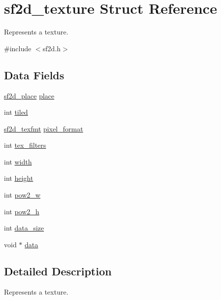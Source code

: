 \hypertarget{structsf2d__texture}{\section{sf2d\-\_\-texture Struct Reference}
\label{structsf2d__texture}
}


Represents a texture.  




{\ttfamily \#include $<$sf2d.\-h$>$}

\subsection*{Data Fields}
\begin{DoxyCompactItemize}
\item 
\hyperlink{sf2d_8h_a07951fad547d423a4cf6521c2e5171ea}{sf2d\-\_\-place} \hyperlink{structsf2d__texture_ac30cfc2de337739d1a19858e4fdacaa4}{place}
\item 
int \hyperlink{structsf2d__texture_a4a66a4712612cc5e3f5cdff7d0e604ec}{tiled}
\item 
\hyperlink{sf2d_8h_a159c44ac8ef84cd08235063d4e220244}{sf2d\-\_\-texfmt} \hyperlink{structsf2d__texture_a1292c9a846b8593163bd3c1eaeb459c2}{pixel\-\_\-format}
\item 
int \hyperlink{structsf2d__texture_a5274643f191bc4e497c445a5cf12e6b5}{tex\-\_\-filters}
\item 
int \hyperlink{structsf2d__texture_a312abd0ee8ab587825804132c136b253}{width}
\item 
int \hyperlink{structsf2d__texture_a055ccacd41038339dd1ded72747ccf8f}{height}
\item 
int \hyperlink{structsf2d__texture_aa1c5388828ad6d18ea37eb2e6ace7f48}{pow2\-\_\-w}
\item 
int \hyperlink{structsf2d__texture_a644c43b5fde6e12c8f1e3cb0280798e1}{pow2\-\_\-h}
\item 
int \hyperlink{structsf2d__texture_a99107fa90e683bab6456da738ff9d005}{data\-\_\-size}
\item 
void $\ast$ \hyperlink{structsf2d__texture_a46673c7ce439c63554a23e6ce83b254f}{data}
\end{DoxyCompactItemize}


\subsection{Detailed Description}
Represents a texture. 


